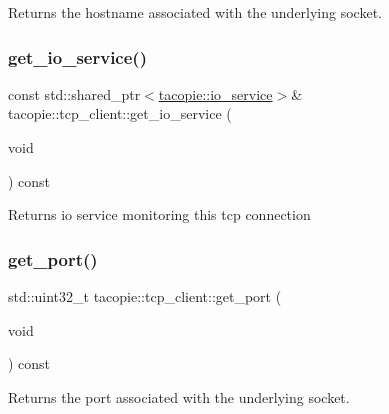 \begin{DoxyReturn}{Returns}
the hostname associated with the underlying socket. 
\end{DoxyReturn}
\mbox{\label{classtacopie_1_1tcp__client_aafbf0aa37cd0472778d09fb163362314}} 
\subsubsection{\texorpdfstring{get\+\_\+io\+\_\+service()}{get\_io\_service()}}
{\footnotesize\ttfamily const std\+::shared\+\_\+ptr$<$\hyperlink{classtacopie_1_1io__service}{tacopie\+::io\+\_\+service}$>$\& tacopie\+::tcp\+\_\+client\+::get\+\_\+io\+\_\+service (\begin{DoxyParamCaption}\item[{void}]{ }\end{DoxyParamCaption}) const}

\begin{DoxyReturn}{Returns}
io service monitoring this tcp connection 
\end{DoxyReturn}
\mbox{\label{classtacopie_1_1tcp__client_a3b42ae2afe6d5ee5f2f16b8bd7846f37}} 
\subsubsection{\texorpdfstring{get\+\_\+port()}{get\_port()}}
{\footnotesize\ttfamily std\+::uint32\+\_\+t tacopie\+::tcp\+\_\+client\+::get\+\_\+port (\begin{DoxyParamCaption}\item[{void}]{ }\end{DoxyParamCaption}) const}

\begin{DoxyReturn}{Returns}
the port associated with the underlying socket. 
\end{DoxyReturn}
\mbox{\label{classtacopie_1_1tcp__client_a1a3834deb1d263ec5816066f74286298}} 
